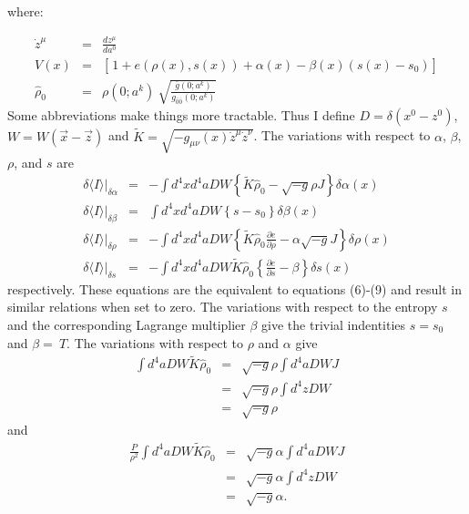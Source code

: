 where:

\begin{eqnarray}
{\dot z}^{\mu} & = & \frac{d z^{\mu}}{d a^{0}}  \\
V(x) & = & \left[ \frac{}{} 1 + e(\rho(x),s(x)) + \alpha(x) - \beta(x) (s(x) - s_{0}) \right]  \\
{\hat \rho}_{0} & = & \rho(0;a^k) \ \sqrt{ \frac{\bar g(0;a^k)}{g_{\bar 0 \bar 0}(0;a^k)}}
\end{eqnarray}
Some abbreviations make things more tractable.  Thus I define $D = \delta(x^0 - z^0)$, $W = W({\vec x} - {\vec z})$ and ${\tilde K} = \sqrt{ -g_{\mu \nu}(x) \dot z^{\mu} \dot z^{\nu}}$.
The variations with respect to $\alpha$, $\beta$, $\rho$, and $s$ are  
\begin{eqnarray}
\delta \langle I \rangle \vert_{\delta \alpha} & = & -\int d^4x d^4a D W 
		\left\{
			{\tilde K} {\hat \rho}_{0} - \sqrt{-g} \rho J
		\right\} \delta \alpha(x) \\
\delta \langle I \rangle \vert_{\delta \beta} & = & \int d^4x d^4a D W
		\left\{
			s - s_{0}
		\right\} \delta \beta(x) \\
\delta \langle I \rangle \vert_{\delta \rho} & = & -\int d^4x d^4a D W
		\left\{
			{\tilde K} {\hat \rho}_{0} \frac{\partial e}{\partial \rho}
			- \alpha \sqrt{-g} J
		\right\} \delta \rho(x)\\
\delta \langle I \rangle \vert_{\delta s} & = & -\int d^4x d^4a D W {\tilde K}
		{\hat \rho}_{0} 
		\left\{
			\frac{\partial e}{\partial s} - \beta
		\right\} \delta s(x)
\end{eqnarray}
respectively.  These equations are the equivalent to equations (6)-(9) and result in similar relations when set to zero.  The variations with respect to the entropy $s$ and the corresponding Lagrange multiplier $\beta$ give the trivial indentities $s = s_{0}$ and $\beta = \ T$.  The variations with respect to $\rho$ and $\alpha$ give 
\begin{eqnarray}
\int d^4a D W {\tilde K} {\hat \rho_{0}} & = & \sqrt{-g}\rho \int d^4a D W J \nonumber \\
					 & = & \sqrt{-g} \rho \int d^4z D W \nonumber \\
					 & = & \sqrt{-g} \rho
\end{eqnarray}
and
\begin{eqnarray}
\frac{P}{\rho^2} \int d^4a D W {\tilde K} {\hat \rho}_{0} & = & \sqrt{-g} \alpha \int d^4a D W J \nonumber \\
					 & = & \sqrt{-g} \alpha \int d^4z D W \nonumber \\
					 & = & \sqrt{-g} \alpha. 
\end{eqnarray}
